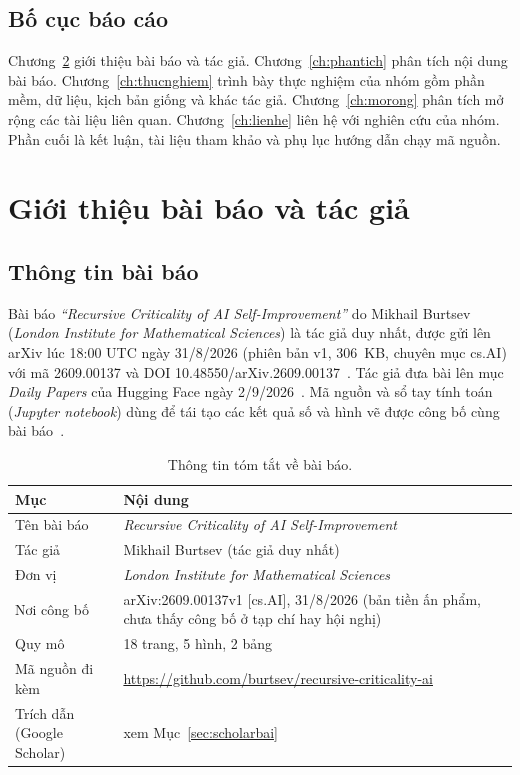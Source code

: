 \documentclass[12pt,a4paper,openany]{report}
\numberwithin{equation}{chapter}   %
\theoremstyle{definition}
\newcommand{\en}[1]{\textit{#1}}   %
\begin{document}
\section{Bố cục báo cáo}
Chương~\ref{ch:gioithieu} giới thiệu bài báo và tác giả. Chương~\ref{ch:phantich} phân tích nội dung bài báo. Chương~\ref{ch:thucnghiem} trình bày thực nghiệm của nhóm gồm phần mềm, dữ liệu, kịch bản giống và khác tác giả. Chương~\ref{ch:morong} phân tích mở rộng các tài liệu liên quan. Chương~\ref{ch:lienhe} liên hệ với nghiên cứu của nhóm. Phần cuối là kết luận, tài liệu tham khảo và phụ lục hướng dẫn chạy mã nguồn.

\chapter{Giới thiệu bài báo và tác giả}\label{ch:gioithieu}
\section{Thông tin bài báo}
Bài báo \en{``Recursive Criticality of AI Self-Improvement''} do Mikhail Burtsev (\en{London Institute for Mathematical Sciences}) là tác giả duy nhất, được gửi lên arXiv lúc 18:00 UTC ngày 31/8/2026 (phiên bản v1, 306~KB, chuyên mục cs.AI) với mã 2609.00137 và DOI 10.48550/arXiv.2609.00137~\cite{burtsev2026,arxivabs}. Tác giả đưa bài lên mục \en{Daily Papers} của Hugging Face ngày 2/9/2026~\cite{hfdaily}. Mã nguồn và sổ tay tính toán (\en{Jupyter notebook}) dùng để tái tạo các kết quả số và hình vẽ được công bố cùng bài báo~\cite{burtsevcode}.

\begin{table}[ht]
\centering
\caption{Thông tin tóm tắt về bài báo.}\label{tab:thongtinbai}
\begin{tabular}{@{}p{4.6cm}p{9.2cm}@{}}
\toprule
\textbf{Mục} & \textbf{Nội dung}\\
\midrule
Tên bài báo & \en{Recursive Criticality of AI Self-Improvement}\\
Tác giả & Mikhail Burtsev (tác giả duy nhất)\\
Đơn vị & \en{London Institute for Mathematical Sciences}\\
Nơi công bố & arXiv:2609.00137v1 [cs.AI], 31/8/2026 (bản tiền ấn phẩm, chưa thấy công bố ở tạp chí hay hội nghị)\\
Quy mô & 18 trang, 5 hình, 2 bảng\\
Mã nguồn đi kèm & \url{https://github.com/burtsev/recursive-criticality-ai}\\
Trích dẫn (Google Scholar) & xem Mục~\ref{sec:scholarbai}\\
\bottomrule
\end{tabular}
\end{table}
\end{document}
